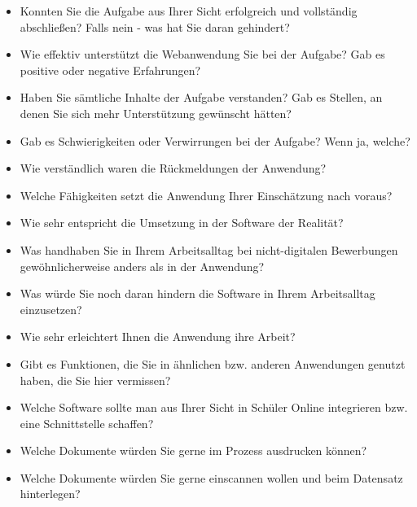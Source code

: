 \begin{itemize}
    \item Konnten Sie die Aufgabe aus Ihrer Sicht erfolgreich und vollständig abschließen? Falls nein - was hat Sie daran gehindert?
    \item Wie effektiv unterstützt die Webanwendung Sie bei der Aufgabe?  Gab es positive oder negative Erfahrungen?
    \item Haben Sie sämtliche Inhalte der Aufgabe verstanden? Gab es Stellen, an denen Sie sich mehr Unterstützung gewünscht hätten?
    \item Gab es Schwierigkeiten oder Verwirrungen bei der Aufgabe? Wenn ja, welche?
    \item Wie verständlich waren die Rückmeldungen der Anwendung?
    \item Welche Fähigkeiten setzt die Anwendung Ihrer Einschätzung nach voraus?
    \item Wie sehr entspricht die Umsetzung in der Software der Realität?
    \item Was handhaben Sie in Ihrem Arbeitsalltag bei nicht-digitalen Bewerbungen gewöhnlicherweise anders als in der Anwendung?
    \item Was würde Sie noch daran hindern die Software in Ihrem Arbeitsalltag einzusetzen?
    \item Wie sehr erleichtert Ihnen die Anwendung ihre Arbeit?
    \item Gibt es Funktionen, die Sie in ähnlichen bzw. anderen Anwendungen genutzt haben, die Sie hier vermissen?
    \item Welche Software sollte man aus Ihrer Sicht in Schüler Online integrieren bzw. eine Schnittstelle schaffen?
    \item Welche Dokumente würden Sie gerne im Prozess ausdrucken können?
    \item Welche Dokumente würden Sie gerne einscannen wollen und beim Datensatz hinterlegen?
\end{itemize}
